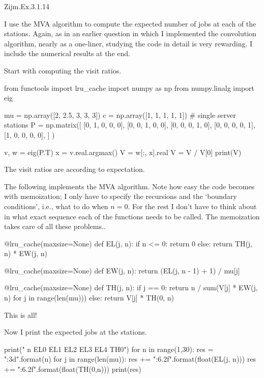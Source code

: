 \begin{exercise}
Zijm.Ex.3.1.14
\begin{solution}
  I use the MVA algorithm to compute the expected number of jobs at
  each of the stations. Again, as in an earlier question in which I
  implemented the convolution algorithm, nearly as a one-liner,
  studying the code in detail is very rewarding. I include the
  numerical results at the end.


 Start with computing the visit ratios.

\begin{pyconsole}
from functools import lru_cache
import numpy as np
from numpy.linalg import eig

mu = np.array([2, 2.5, 3, 3, 3])
c = np.array([1, 1, 1, 1, 1])  # single server stations
P = np.matrix([
    [0, 1, 0, 0, 0],
    [0, 0, 1, 0, 0],
    [0, 0, 0, 1, 0],
    [0, 0, 0, 0, 1],
    [1, 0, 0, 0, 0],
]
)

v, w = eig(P.T)
x = v.real.argmax()
V = w[:, x].real
V = V / V[0]
print(V)
  
\end{pyconsole}
The visit ratios are according to expectation.


The following implements the MVA algorithm. Note how easy the code becomes with
memoization; I only have to specify the recursions and the `boundary
conditions', i.e., what to do when $n=0$. For the rest I don't have to
think about in what exact sequence each of the functions needs to be
called. The memoization takes care of all these problems..

\begin{pyconsole}
@lru_cache(maxsize=None)
def EL(j, n):
    if n <= 0:
        return 0
    else:
        return TH(j, n) * EW(j, n)


@lru_cache(maxsize=None)
def EW(j, n):
    return (EL(j, n - 1) + 1) / mu[j]


@lru_cache(maxsize=None)
def TH(j, n):
    if j == 0:
        return n / sum(V[j] * EW(j, n) for j in range(len(mu)))
    else:
        return V[j] * TH(0, n)
  
\end{pyconsole}
This is all!


Now I print the expected jobs at the stations. 

\begin{pyconsole}
print("  n   EL0   EL1   EL2  EL3   EL4   TH0")
for n in range(1,30):
    res = "{:3d}".format(n)
    for j in range(len(mu)):
        res += "{:6.2f}".format(float(EL(j, n)))
    res += "{:6.2f}".format(float(TH(0,n)))
    print(res)
  

\end{pyconsole}
\end{solution}
\end{exercise}
